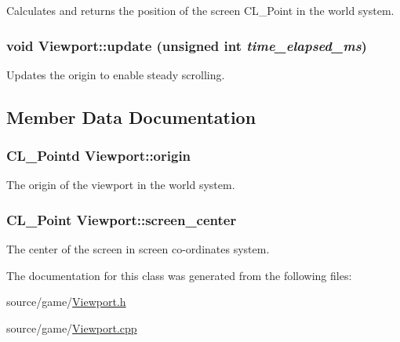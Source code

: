 \label{classViewport_ab6c214c3791a3314711e933e831d6ed0}
Calculates and returns the position of the screen CL\_\-Point in the world system. \hypertarget{classViewport_ad6b4c3ce84e139598414bb61c4802e17}{
\subsubsection[{update}]{\setlength{\rightskip}{0pt plus 5cm}void Viewport::update (unsigned int {\em time\_\-elapsed\_\-ms})}}
\label{classViewport_ad6b4c3ce84e139598414bb61c4802e17}
Updates the origin to enable steady scrolling. 

\subsection{Member Data Documentation}
\hypertarget{classViewport_ac1415e2e5f8ccad7e50dc834126439fa}{
\subsubsection[{origin}]{\setlength{\rightskip}{0pt plus 5cm}CL\_\-Pointd {\bf Viewport::origin}}}
\label{classViewport_ac1415e2e5f8ccad7e50dc834126439fa}
The origin of the viewport in the world system. \hypertarget{classViewport_ada6d3facef528063b5204a530f8b30bf}{
\subsubsection[{screen\_\-center}]{\setlength{\rightskip}{0pt plus 5cm}CL\_\-Point {\bf Viewport::screen\_\-center}}}
\label{classViewport_ada6d3facef528063b5204a530f8b30bf}
The center of the screen in screen co-\/ordinates system. 

The documentation for this class was generated from the following files:\begin{DoxyCompactItemize}
\item 
source/game/\hyperlink{Viewport_8h}{Viewport.h}\item 
source/game/\hyperlink{Viewport_8cpp}{Viewport.cpp}\end{DoxyCompactItemize}
